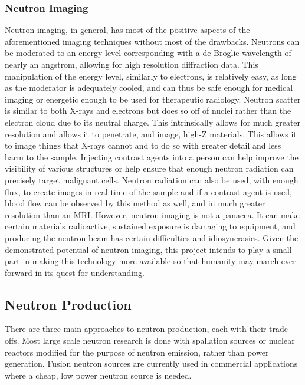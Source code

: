\subsubsection{Neutron Imaging}
Neutron imaging, in general, has most of the positive aspects of the aforementioned imaging techniques without most of the drawbacks. Neutrons can be moderated to an energy level corresponding with a de Broglie wavelength of nearly an angstrom, allowing for high resolution diffraction data. This manipulation of the energy level, similarly to electrons, is relatively easy, as long as the moderator is adequately cooled, and can thus be safe enough for medical imaging or energetic enough to be used for therapeutic radiology. Neutron scatter is similar to both X-rays and electrons but does so off of nuclei rather than the electron cloud due to its neutral charge. This intrinsically allows for much greater resolution and allows it to penetrate, and image, high-Z materials. This allows it to image things that X-rays cannot and to do so with greater detail and less harm to the sample. Injecting contrast agents into a person can help improve the visibility of various structures or help ensure that enough neutron radiation can precisely target malignant cells. Neutron radiation can also be used, with enough flux, to create images in real-time of the sample and if a contrast agent is used, blood flow can be observed by this method as well, and in much greater resolution than an MRI. However, neutron imaging is not a panacea. It can make certain materials radioactive, sustained exposure is damaging to equipment, and producing the neutron beam has certain difficulties and idiosyncrasies. Given the demonstrated potential of neutron imaging, this project intends to play a small part in making this technology more available so that humanity may march ever forward in its quest for understanding.\\

\subsection{Neutron Production}
There are three main approaches to neutron production, each with their trade-offs. Most large scale neutron research is done with spallation sources or nuclear reactors modified for the purpose of neutron emission, rather than power generation. Fusion neutron sources are currently used in commercial applications where a cheap, low power neutron source is needed.\\

